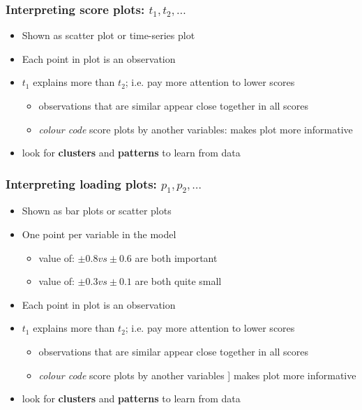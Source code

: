 \documentclass[handout, 12pt]{beamer}
\begin{document}
\begin{frame}\frametitle{Interpreting score plots: \(t_1, t_2, \ldots \)}

\begin{itemize}
	\item	Shown as scatter plot or time-series plot

	\item	Each point in plot is an observation

	\item	\(t_1\) explains more than \(t_2\); i.e. pay more attention to lower scores

		\begin{itemize}
			\item	observations that are similar appear close together in all scores
			\item	\emph{colour code} score plots by another variables: makes plot more informative
		\end{itemize}

	\item	look for \textbf{clusters} and \textbf{patterns} to learn from data
\end{itemize}
\end{frame}

\begin{frame}\frametitle{Interpreting loading plots: \( p_1, p_2, \ldots \)}

\begin{itemize}
	\item	Shown as bar plots or scatter plots

	\item 	One point per variable in the model
	
		\begin{itemize}
			\item value of: \(\pm 0.8 vs \pm 0.6\) are both important
			\item value of: \(\pm 0.3 vs \pm 0.1\) are both quite small			
		\end{itemize}

	\item 	Each point in plot is an observation

	\item 	\(t_1\) explains more than \(t_2\); i.e. pay more attention to lower scores

		\begin{itemize}
			\item	observations that are similar appear close together in all scores
			\item 	\emph{colour code} score plots by another variables ] makes plot more informative
		\end{itemize}

	\item 	look for \textbf{clusters} and \textbf{patterns} to learn from data
\end{itemize}
\end{frame}
\end{document}
